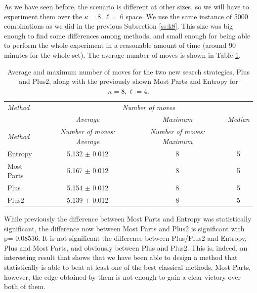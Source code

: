 \documentclass[preprint,12pt]{elsarticle}
\begin{document}
As we have seen before, the scenario is different at other sizes, so we will have to experiment them over the $\kappa=8,
\ell=6$ space. We use the same instance of 5000 combinations as we did
in the previous Subsection \ref{ss:k8}. This size was big enough to find some differences among
methods, and small enough for being able to perform the whole
experiment in a reasonable amount of time (around 90 minutes for the
whole set). The average number of moves is shown in Table
\ref{tab:plus:48}.
%
\begin{table}[htb]
\caption{Average and maximum number of moves for the two new search
  strategies, Plus and Plus2, along with the previously shown Most Parts
  and Entropy for $\kappa=8, \ell=4$. \label{tab:plus:48}}
  \centering
\smallskip
\begin{tabular}{|l|c|c|c|}
\hline
\emph{Method} & \multicolumn{3}{c|}{\emph{Number of moves}}\\
 & \emph{Average} & \emph{Maximum} & \emph{Median} \\
\emph{Method} & \emph{Number of moves: Average} & \emph{Number of
  moves: Maximum} \\
\hline
Entropy & 5.132 $\pm$ 0.012 & 8  & 5\\
Most Parts & 5.167 $\pm$ 0.012 & 8 & 5 \\
Plus & 5.154 $\pm$ 0.012 & 8 & 5\\
Plus2 & 5.139  $\pm$ 0.012 & 8 & 5\\
\hline
\end{tabular}
\end{table}
%
While previously the difference between Most Parts and Entropy was 
statistically significant, the difference now between Most Parts and
Plus2 is significant with p= 0.08536. It is not significant the
difference between Plus/Plus2 and
Entropy, Plus and Most Parts, and obviously between Plus and Plus2. This is, indeed, an
interesting result that shows that we have been able to design a
method that statistically is able to beat at least one of the best
classical methods, Most Parts, however, the edge obtained by them is
not enough to gain a clear victory over both of them. 
%
\end{document}
